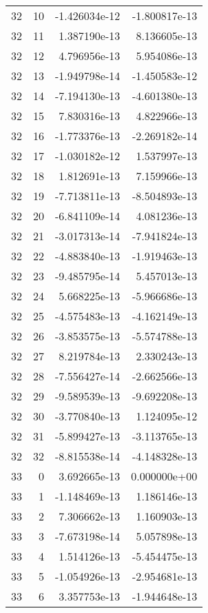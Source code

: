 \begin{tabular}{rrrr}
  32 &   10 & -1.426034e-12 & -1.800817e-13 \\
  32 &   11 &  1.387190e-13 &  8.136605e-13 \\
  32 &   12 &  4.796956e-13 &  5.954086e-13 \\
  32 &   13 & -1.949798e-14 & -1.450583e-12 \\
  32 &   14 & -7.194130e-13 & -4.601380e-13 \\
  32 &   15 &  7.830316e-13 &  4.822966e-13 \\
  32 &   16 & -1.773376e-13 & -2.269182e-14 \\
  32 &   17 & -1.030182e-12 &  1.537997e-13 \\
  32 &   18 &  1.812691e-13 &  7.159966e-13 \\
  32 &   19 & -7.713811e-13 & -8.504893e-13 \\
  32 &   20 & -6.841109e-14 &  4.081236e-13 \\
  32 &   21 & -3.017313e-14 & -7.941824e-13 \\
  32 &   22 & -4.883840e-13 & -1.919463e-13 \\
  32 &   23 & -9.485795e-14 &  5.457013e-13 \\
  32 &   24 &  5.668225e-13 & -5.966686e-13 \\
  32 &   25 & -4.575483e-13 & -4.162149e-13 \\
  32 &   26 & -3.853575e-13 & -5.574788e-13 \\
  32 &   27 &  8.219784e-13 &  2.330243e-13 \\
  32 &   28 & -7.556427e-14 & -2.662566e-13 \\
  32 &   29 & -9.589539e-13 & -9.692208e-13 \\
  32 &   30 & -3.770840e-13 &  1.124095e-12 \\
  32 &   31 & -5.899427e-13 & -3.113765e-13 \\
  32 &   32 & -8.815538e-14 & -4.148328e-13 \\
  33 &    0 &  3.692665e-13 &  0.000000e+00 \\
  33 &    1 & -1.148469e-13 &  1.186146e-13 \\
  33 &    2 &  7.306662e-13 &  1.160903e-13 \\
  33 &    3 & -7.673198e-14 &  5.057898e-13 \\
  33 &    4 &  1.514126e-13 & -5.454475e-13 \\
  33 &    5 & -1.054926e-13 & -2.954681e-13 \\
  33 &    6 &  3.357753e-13 & -1.944648e-13 \\

\end{tabular}
